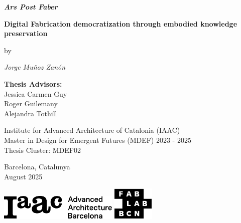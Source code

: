 \begin{titlepage}
\centering
\vspace*{2.5cm}

{\fontsize{24}{28}\selectfont\textbf{\textit{Ars Post Faber}}}

\vspace{0.3cm}

{\fontsize{18}{22}\selectfont\textbf{Digital Fabrication democratization through embodied knowledge preservation}}

\vspace{0.4cm}

{\fontsize{14}{16}\selectfont by}

\vspace{0.4cm}

{\fontsize{16}{20}\selectfont\textit{Jorge Muñoz Zanón}}

\vspace{1.5cm}

{\fontsize{12}{15}\selectfont
\textbf{Thesis Advisors:}\\[0.1cm]
Jessica Carmen Guy\\
Roger Guilemany\\
Alejandra Tothill
}

\vspace{2cm}

{\fontsize{12}{15}\selectfont
Institute for Advanced Architecture of Catalonia (IAAC)\\[0.05cm]
Master in Design for Emergent Futures (MDEF) 2023 - 2025\\[0.05cm]
Thesis Cluster: MDEF02
}

\vspace{2cm}

{\fontsize{14}{16}\selectfont Barcelona, Catalunya\\[0.05cm]
August 2025}

\vspace{3cm}

\begin{center}
\includegraphics[height=1.2cm]{figures/logo/iaac_logo.pdf}
\hspace{1.5cm}
\includegraphics[height=1.6cm]{figures/logo/fablabbcn-logo.pdf}
\end{center}

\end{titlepage}